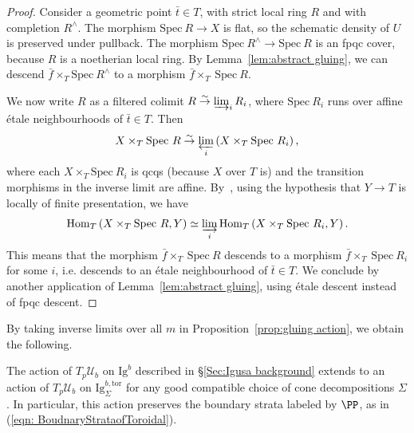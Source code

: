 \documentclass[letterpaper,11pt]{amsart}
\begin{document}
\begin{proof} Consider a geometric point $\bar{t}\in T$, with strict local ring $R$ and with completion $R^{\wedge}$. 
The morphism $\mathrm{Spec}\ R\to X$ is flat, so the schematic density 
of $U$ is preserved under pullback. The morphism $\mathrm{Spec}\ R^{\wedge}\to \mathrm{Spec}\ R$ is an fpqc
cover, because $R$ is a noetherian local ring. By Lemma~\ref{lem:abstract gluing}, we can descend $\bar{f}\times_T\mathrm{Spec}\ R^{\wedge}$ to 
a morphism $\bar{f}\times_{T}\ \mathrm{Spec}\ R$. 

We now write $R$ as a filtered colimit $R \stackrel{\sim}{\to} \varinjlim_{i} R_{i}$, 
where $\mathrm{Spec}\ R_i$ runs over affine \'etale neighbourhoods of $\bar{t}\in T$. Then
\[
X\times_{T}\mathrm{Spec}\ R \stackrel{\sim}{\to} \varprojlim_{i} \left(X\times_{T}\mathrm{Spec}\ R_i\right),
\]
where each $X\times_{T}\mathrm{Spec}\ R_i$ is qcqs (because $X$ over $T$ is) and the 
transition morphisms in the inverse limit are affine. By~\cite[Tag 01ZC]{stacks-project}, using the hypothesis
that $Y\to T$ is locally of finite presentation, we have 
\[
\mathrm{Hom}_{T}\left(X\times_T \mathrm{Spec}\ R, Y\right) \simeq 
\varinjlim_{i}\mathrm{Hom}_{T}\left(X\times_T \mathrm{Spec}\ R_i, Y\right). 
\]
This means that the morphism $\bar{f}\times_{T}\ \mathrm{Spec}\ R$ descends to a morphism 
$\bar{f}\times_{T}\ \mathrm{Spec}\ R_i$ for some $i$, i.e. descends to an \'etale neighbourhood of $\bar{t}\in T$. 
We conclude by another application of Lemma~\ref{lem:abstract gluing}, using \'etale descent instead of fpqc descent. 
\end{proof}
By taking inverse limits over all $m$ in Proposition~\ref{prop:gluing action}, we obtain the following. 
\begin{corollary}\label{cor: TpUbAction} The action of $T_p\mathcal{U}_b$ on $\mathrm{Ig}^b$ described in \S\ref{Sec:Igusa background} extends to an action of $T_p\mathcal{U}_b$ on $\mathrm{Ig}^{b,\mathrm{tor}}_{\Sigma}$ for any good compatible choice of cone decompositions $\Sigma$. In particular, this action preserves the boundary strata labeled by $\PP$, as in (\ref{eqn: BoudnaryStrataofToroidal}).
\end{corollary}
\end{document}
